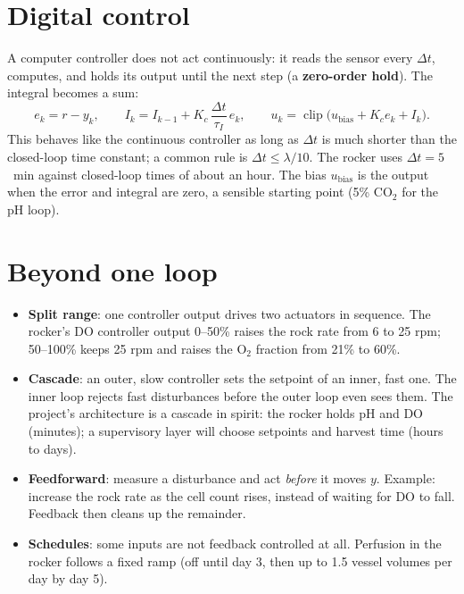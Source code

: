 \documentclass[11pt,a4paper]{article}
\begin{document}
\section{Digital control}
A computer controller does not act continuously: it reads the sensor every $\Delta t$, computes, and holds
its output until the next step (a \textbf{zero-order hold}). The integral becomes a sum:
\begin{equation}
  e_k = r - y_k, \qquad
  I_k = I_{k-1} + K_c\,\frac{\Delta t}{\tau_I}\,e_k, \qquad
  u_k = \operatorname{clip}\bigl(u_{\mathrm{bias}} + K_c e_k + I_k\bigr).
\end{equation}
This behaves like the continuous controller as long as $\Delta t$ is much shorter than the closed-loop
time constant; a common rule is $\Delta t \le \lambda/10$. The rocker uses $\Delta t = 5$~min against
closed-loop times of about an hour. The bias $u_{\mathrm{bias}}$ is the output when the error and integral
are zero, a sensible starting point (5\% CO$_2$ for the pH loop).

\section{Beyond one loop}
\begin{itemize}
  \item \textbf{Split range}: one controller output drives two actuators in sequence. The rocker's DO
    controller output 0--50\% raises the rock rate from 6 to 25 rpm; 50--100\% keeps 25 rpm and raises the
    O$_2$ fraction from 21\% to 60\%.
  \item \textbf{Cascade}: an outer, slow controller sets the setpoint of an inner, fast one. The inner loop
    rejects fast disturbances before the outer loop even sees them. The project's architecture is a cascade
    in spirit: the rocker holds pH and DO (minutes); a supervisory layer will choose setpoints and harvest
    time (hours to days).
  \item \textbf{Feedforward}: measure a disturbance and act \emph{before} it moves $y$. Example: increase
    the rock rate as the cell count rises, instead of waiting for DO to fall. Feedback then cleans up the
    remainder.
  \item \textbf{Schedules}: some inputs are not feedback controlled at all. Perfusion in the rocker follows
    a fixed ramp (off until day 3, then up to 1.5 vessel volumes per day by day 5).
\end{itemize}

\end{document}
